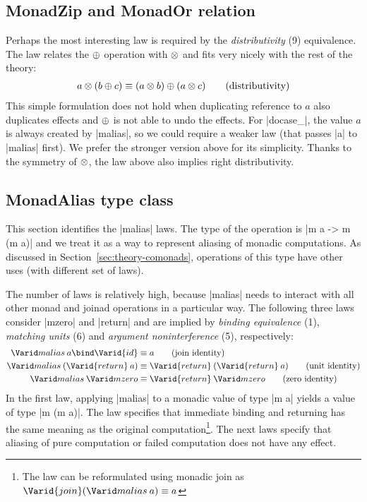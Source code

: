 \documentclass{sigplanconf}
\begin{document}
\subsection{MonadZip and MonadOr relation}
Perhaps the most interesting law is required by the \textit{distributivity} (9) equivalence.
The law relates the $\oplus$ operation with $\otimes$ and fits very nicely with the rest of the 
theory: 
\begin{align*}
  a \otimes (b \oplus c) \equiv (a \otimes b) \oplus (a \otimes c) \tag{distributivity}
\end{align*}
This simple formulation does not hold when duplicating reference to $a$ also duplicates effects 
and $\oplus$ is not able to undo the effects. For |docase_|, the value $a$ is always created by 
|malias|, so we could require a weaker law (that passes |a| to |malias| first). We prefer the 
stronger version above for its simplicity. Thanks to the symmetry of $\otimes$, the law above also 
implies right distributivity.


\subsection{MonadAlias type class}
This section identifies the |malias| laws. The type of the operation is |m a -> m (m a)| and we 
treat it as a way to represent aliasing of monadic computations. As discussed in 
Section~\ref{sec:theory-comonads}, operations of this type have other uses (with different set 
of laws).

The number of laws is relatively high, because |malias| needs to interact with all other 
monad and joinad operations in a particular way. The following three laws consider |mzero| and |return|
and are implied by \textit{binding equivalence} (1), \textit{matching units} (6) and \textit{argument
noninterference} (5), respectively:
\begin{align*}
\malias \: a \bind \Varid{id} &\equiv a \tag{join identity} \\
\malias \: (\Varid{return} \: a) &\equiv \Varid{return} \: (\Varid{return} \: a) \tag{unit identity} \\
\malias \: \mzero &\equiv \Varid{return} \: \mzero \tag{zero identity}
\end{align*}
In the first law, applying |malias| to a monadic value of type |m a| yields a value of type 
|m (m a)|. The law specifies that immediate binding and returning has the same meaning as the original
computation\footnote{The law can be reformulated using monadic join as $\Varid{join} (\malias \: a) \equiv a$}.
The next laws specify that aliasing of pure computation or failed computation does not have any effect. 
\end{document}
